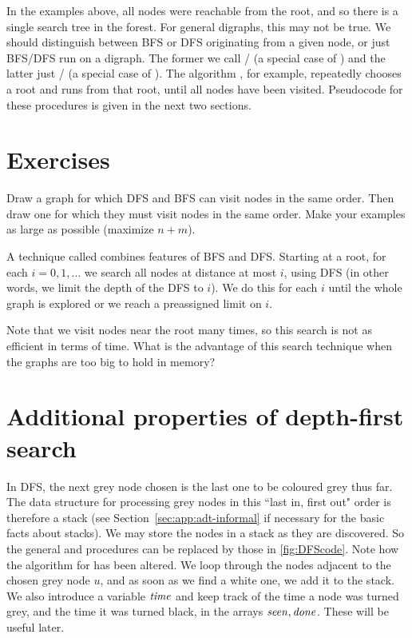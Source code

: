 In the examples above, all nodes were reachable from the root, and so
there is a single search tree in the forest. For general digraphs, this
may not be true. We should distinguish between BFS or DFS originating
from a given node, or just BFS/DFS run on a digraph. The former we call
/ (a special case of ) 
and the
latter just / (a special case of ). 
The algorithm , for example, repeatedly chooses a root and runs
 from that root, until all nodes have been visited.
Pseudocode for these procedures is given in the next two sections.

\section*{Exercises}

\begin{Exercise}
\label{exr:bfs-vs-dfs}
Draw a graph for which DFS and BFS can visit nodes in the same order. Then 
draw one for which they must visit nodes in the same order. Make your examples 
as large as possible (maximize $n+m$).
\end{Exercise}

\begin{Exercise}
\label{exr:iterative-deep}
A technique called  combines features of BFS and DFS.
Starting at a root, for each $i = 0, 1, \dots$ we search all nodes at distance 
at most $i$, using DFS (in other words, we limit the depth of the DFS to $i$). 
We do this for each $i$ until the whole graph is explored or we reach a 
preassigned limit on $i$.

Note that we visit nodes near the root many times, so this search is not as 
efficient in terms of time.  What is the advantage of this search
technique when the graphs are too big to hold in memory? 
\end{Exercise}

\section{Additional properties of depth-first search}
\label{ss: DFS}

In DFS, the next grey node chosen is the last one to be coloured grey thus far. 
The data structure for processing grey nodes  in this ``last in, first
out" order is therefore a stack (see Section~\ref{sec:app:adt-informal} if
necessary for the basic facts about stacks). We may store the nodes in a
stack as they are discovered. So the general  and
 procedures can be replaced by those in
\cref{fig:DFScode}. Note how the algorithm for  has
been altered. We loop through the nodes adjacent to the chosen grey node
$u$, and as soon as we find a white one, we add it to the stack. We also
introduce a variable $\operatorname{\text{\textit{time}}}$ and keep track of the time a node was turned
grey, and the time it was turned black, in the arrays $\operatorname{\text{\textit{seen}}}, \operatorname{\text{\textit{done}}}$.
These will be useful later.


